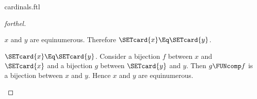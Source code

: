\documentclass{stex}
\begin{document}
\begin{smodule}{cardinals.ftl}
\begin{proof}[forthel]
\begin{case}{$x$ and $y$ are equinumerous.}
    Therefore $\SETcard{x} \Eq \SETcard{y}$.
  \end{case}

  \begin{case}{$\SETcard{x} \Eq \SETcard{y}$.}
    Consider a bijection $f$ between $x$ and $\SETcard{x}$ and a bijection $g$
    between $\SETcard{y}$ and $y$.
    Then $g \FUNcomp f$ is a bijection between $x$ and $y$.
    Hence $x$ and $y$ are equinumerous.
  \end{case}
\end{proof}
\end{smodule}
\end{document}
